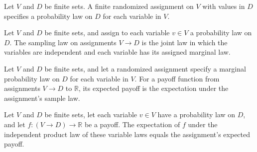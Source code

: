 \begin{definition}
\label{FABL.FiniteRandomizedAssignment}
\leanok
Let $V$ and $D$ be finite sets. A finite randomized assignment on $V$ with values in $D$
specifies a probability law on $D$ for each variable in $V$.
\end{definition}

\begin{definition}
\label{FABL.FiniteRandomizedAssignment.sampleLaw}
\leanok
{}
Let $V$ and $D$ be finite sets, and assign to each variable $v\in V$ a probability law
on $D$. The sampling law on assignments $V\to D$ is the joint law in which the variables
are independent and each variable has its assigned marginal law.
\end{definition}

\begin{definition}
\label{FABL.FiniteRandomizedAssignment.expectedPayoff}
\leanok
{}
Let $V$ and $D$ be finite sets, and let a randomized assignment specify a marginal
probability law on $D$ for each variable in $V$. For a payoff function from assignments
$V\to D$ to $\mathbb{R}$, its expected payoff is the expectation under the assignment's
sample law.
\end{definition}

\begin{theorem}
\label{FABL.FiniteRandomizedAssignment.expectedPayoff_sample}
\leanok
{}
Let $V$ and $D$ be finite sets, let each variable $v\in V$ have a probability law on
$D$, and let $f:(V\to D)\to\mathbb{R}$ be a payoff. The expectation of $f$ under the
independent product law of these variable laws equals the assignment’s expected payoff.
\end{theorem}

